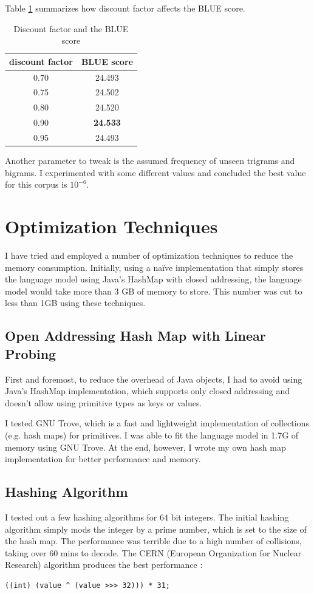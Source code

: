 \documentclass[12pt]{article}   %
\begin{document}
Table \ref{tbl:discount} summarizes how discount factor affects the BLUE score.

\begin{table}
\label{tbl:discount}
\centering
\begin{tabular}{ c | c  }
	discount factor & BLUE score \\
	\hline
	0.70 & 24.493 \\
	0.75 & 24.502 \\
	0.80 & 24.520 \\
	0.90 & \textbf{24.533} \\
	0.95 & 24.493
\end{tabular}
\caption{Discount factor and the BLUE score}
\end{table}

Another parameter to tweak is the assumed frequency of unseen trigrams and bigrams. I experimented with some different values and concluded the best value for this corpus is $10^{-6}$.


\section{Optimization Techniques}
I have tried and employed a number of optimization techniques to reduce the memory consumption. Initially, using a naïve implementation that simply stores the language model using Java’s HashMap with closed addressing, the language model would take more than 3 GB of memory to store. This number was cut to less than 1GB using these techniques.

\subsection{Open Addressing Hash Map with Linear Probing}
First and foremost, to reduce the overhead of Java objects, I had to avoid using Java's HashMap implementation, which supports only closed addressing and doesn't allow using primitive types as keys or values.

I tested GNU Trove, which is a fast and lightweight implementation of collections (e.g. hash maps) for primitives. I was able to fit the language model in 1.7G of memory using GNU Trove. At the end, however, I wrote my own hash map implementation for better performance and memory.


\subsection{Hashing Algorithm}
\label{sec:hashing}
I tested out a few hashing algorithms for 64 bit integers. The initial hashing algorithm simply mods the integer by a prime number, which is set to the size of the hash map. The performance was terrible due to a high number of collisions, taking over 60 mins to decode. The CERN (European Organization for Nuclear Research) algorithm produces the best performance :
\begin{verbatim}
((int) (value ^ (value >>> 32))) * 31;
\end{verbatim}
\end{document}
